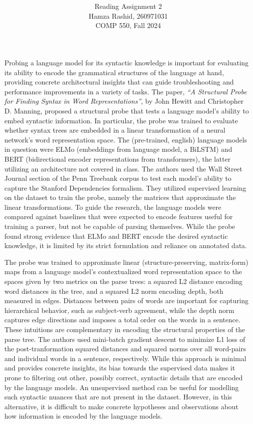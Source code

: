 \documentclass[11pt]{article}
\title{ }
\author{ Reading Assignment 2 \\ Hamza Rashid, 260971031 \\ COMP 550, Fall 2024}
\date{}
\begin{document}
\maketitle

\vspace{-5ex}
Probing a language model for its syntactic knowledge is important
for evaluating its ability to encode the grammatical structures of
the language at hand, providing concrete architectural insights 
that can guide troubleshooting and performance improvements in a variety of tasks.
The paper, \textit{“A Structural Probe for Finding 
Syntax in Word Representations”}, by John Hewitt and Christopher D. Manning,
proposed a structural probe that tests a
language model's ability to embed syntactic information. 
In particular,
the probe was trained to evaluate whether syntax trees are 
embedded in a linear transformation of a 
neural network’s word representation space.
The (pre-trained, english) language models in question were ELMo (embeddings from language model, a BiLSTM)
and BERT (bidirectional encoder representations from transformers), 
the latter utilizing an architecture not covered in class. The authors used 
the Wall Street Journal section of the 
Penn Treebank corpus to test each model's ability to capture
the Stanford Dependencies formalism. 
They utilized supervised learning on the dataset
to train the probe, namely the matrices that 
approximate the linear transformations.
To guide the research, the language models
were compared against baselines that were expected to 
encode features useful for training a parser, but not be capable of
parsing themselves. While the probe found strong evidence
that ELMo and BERT encode the desired syntactic knowledge, 
it is limited by its strict formulation and reliance on annotated data.

The probe was trained to approximate
linear (structure-preserving, matrix-form) maps
from a language model's contextualized word representation space to 
the spaces given by two metrics on the parse trees: 
a squared L2 distance encoding 
word distances in the tree, and
a squared L2 norm encoding depth, 
both measured in edges. Distances between pairs of words
are important for capturing hierarchical behavior, such as subject-verb agreement,
while the depth norm captures edge directions and imposes a total order 
on the words in a sentence. These intuitions are complementary 
in encoding the structural properties of the parse tree.
The authors used mini-batch gradient descent 
to minimize L1 loss of the post-tranformation squared distances and 
squared norms over all word-pairs and individual words in a sentence, respectively.
While this approach is minimal and provides concrete insights,
its bias towards the supervised data makes it prone to filtering
out other, possibly correct, syntactic details that are
encoded by the language models.
An unsupervised method can be useful for modelling such syntactic nuances
that are not present in the dataset. However, in this alternative,
it is difficult to make concrete hypotheses and observations about how
information is encoded by the language models. 
\end{document}
